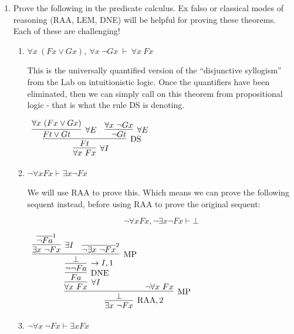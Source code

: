 \documentclass[11pt]{report}
\newcommand{\temp}[2]{{\overline{#2}}^{#1}}
\begin{document}
\begin{enumerate}
\begin{enumerate}
		\end{enumerate}	

	\newpage
	\item Prove the following in the predicate calculus. Ex falso or classical modes of reasoning (RAA, LEM, DNE) will be helpful for proving these theorems. Each of these are challenging!

		\begin{enumerate}
			\item $\forall x \ (Fx \lor Gx), \ \forall x \ \lnot Gx \ \vdash \ \forall x \ Fx$
			
			This is the universally quantified version of the ``disjunctive syllogism'' from the Lab on intuitionistic logic. Once the quantifiers have been eliminated, then we can simply call on this theorem from propositional logic - that is what the rule DS is denoting. 

			\begin{center}
				$\begin{array}{c}
					\infer[\forall I]{\forall x \ Fx}
						{\infer[\DS]{Ft}
							{\infer[\forall E]{Ft \lor Gt}
								{\forall x \ (Fx \lor Gx)}
							&
							\infer[\forall E]{\lnot Gt}
								{\forall x \ \lnot Gx}}}
				\end{array}$
			\end{center}
			
			\item $ \neg \forall x Fx \vdash \exists x \neg Fx$
			
			We will use RAA to prove this. Which means we can prove the following sequent instead, before using RAA to prove the original sequent:
			
			$$ \neg \forall x Fx, \lnot\exists x \neg Fx \vdash \bot $$
			
			\begin{center}
				$\begin{array}{c}
					\infer[\RAA,2]{\exists x \ \lnot Fx}
						{\infer[\MP]{\bot}
							{\infer[\forall I]{\forall x \ Fx}
								{\infer[\DNE]{Fa}
									{\infer[\to I,1]{\lnot\lnot Fa}
										{\infer[\MP]{\bot}
											{\infer[\exists I]{\exists x \ \lnot Fx}
												{\temp{1}{\lnot Fa}}
											&
											\temp{2}{\lnot \exists x \ \lnot Fx}}}}}
							&
							\lnot \forall x \ Fx}}
				\end{array}$
			\end{center}
			
			\item $\lnot \forall x \ \lnot Fx \vdash \exists x Fx$
			

\end{enumerate}
\end{enumerate}
\end{document}
